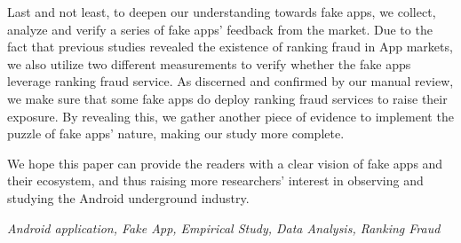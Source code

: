 Last and not least, to deepen our understanding towards fake apps, we collect, analyze and verify a series of fake apps' feedback from the market.
Due to the fact that previous studies revealed the existence of ranking fraud in App markets, we also utilize two different measurements to verify whether the fake apps leverage ranking fraud service.
As discerned and confirmed by our manual review, we make sure that some fake apps do deploy ranking fraud services to raise their exposure.
By revealing this, we gather another piece of evidence to implement the puzzle of fake apps' nature, making our study more complete.

We hope this paper can provide the readers with a clear vision of fake apps and their ecosystem, and thus raising more researchers' interest in observing and studying the Android underground industry.

{} \textit{Android application, Fake App, Empirical Study, Data Analysis, Ranking Fraud}
